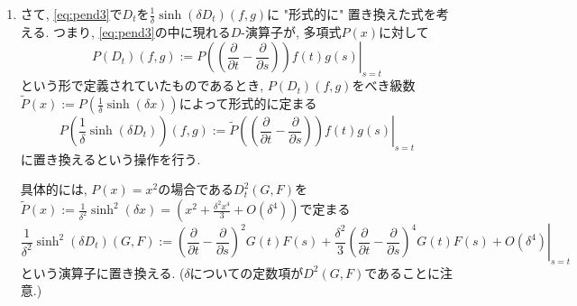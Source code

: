 \documentclass[a4paper]{ujarticle}
\numberwithin{equation}{section}
\theoremstyle{definition}
\begin{document}
\begin{enumerate}
\begin{equation}
        \end{equation}
        で定義する. これにより,\textbf{中心差分演算子}$\Delta^2(D_t)$と\textbf{平均化演算子}$\Pi^2(D_t)$も
        \begin{align}
            \Delta^2(D_{t})(f, g) &= \frac{1}{\delta} \frac{\exp(\delta D_t)(f, g) - \exp( - \delta D_t)(f, g)}{2} = \frac{1}{\delta} \sinh(\delta D_t)(f, g), \\
            \Pi^2(D_{t}) (f, g) &:= \frac{\exp(\delta D_t)(f, g) + \exp(- \delta D_t)(f, g)}{2} = \cosh(\delta D_t)(f,g)
        \end{align}
        で定義する.
        $\displaystyle \frac{\partial}{\partial t}, \ \frac{\partial}{\partial s}$は可換な作用素なので, 
        \begin{align}
            \exp \left( \delta \left(\frac{\partial}{\partial t} - \frac{\partial}{\partial s}\right) \right) (f(t) g(s)) 
            &= \exp\left(\delta \frac{\partial}{\partial t}\right) f(t) \exp \left(- \delta \frac{\partial}{\partial s}\right) g(s) \\
            &= f(t + \delta) g(s - \delta)
        \end{align}
        となる. ゆえに,
        \[
            \exp(\delta D_t)(f, g) = f(t + \delta) g(t - \delta).
        \]
        \item さて, \eqref{eq:pend3}で$D_t$を$\frac{1}{\delta} \sinh(\delta D_t)(f, g)$に "形式的に" 置き換えた式を考える.
        つまり, \eqref{eq:pend3}の中に現れる$D$-演算子が, 多項式$P(x)$に対して
        \[
            P(D_t)(f, g) := \left. P\left((\frac{\partial}{\partial t} - \frac{\partial}{\partial s})\right)f(t) g(s) \right|_{s = t}
        \]
        という形で定義されていたものであるとき, $P(D_t)(f, g)$をべき級数$\tilde{P}(x) := P(\frac{1}{\delta} \sinh(\delta x))$によって形式的に定まる
        \[
            P(\frac{1}{\delta} \sinh(\delta D_t))(f, g) := \left.\tilde{P}\left((\frac{\partial}{\partial t} - \frac{\partial}{\partial s})\right)f(t) g(s) \right|_{s = t}
        \]
        に置き換えるという操作を行う. 
        
        具体的には, $P(x) = x^2$の場合である$D_t^2(G, F)$を$\displaystyle \tilde{P}(x) := \frac{1}{\delta^2} \sinh^2(\delta x) = (x^2 + \frac{\delta^2 x^4}{3} + O(\delta^4))$で定まる
        \[
            \frac{1}{\delta^2} \sinh^2(\delta D_{t})(G, F) := \left. \left( \frac{\partial}{\partial t} - \frac{\partial}{\partial s}\right)^{2}G(t) F(s) + \frac{\delta^2}{3} \left( \frac{\partial}{\partial t} - \frac{\partial}{\partial s}\right)^{4} G(t) F(s) + O(\delta^4)\right|_{s = t}
        \]
        という演算子に置き換える. ($\delta$についての定数項が$D^2(G, F)$であることに注意.)


\end{enumerate}
\end{document}
